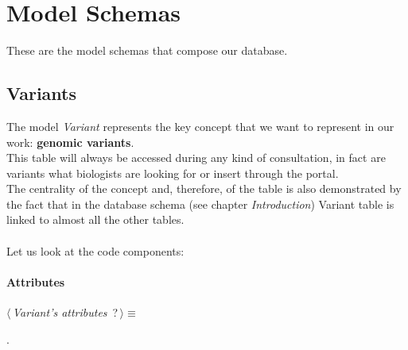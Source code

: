 
\section{Model Schemas}
These are the model schemas that compose our database.


\subsection{Variants}
The model \emph{Variant} represents the key concept that we want to represent in our work: \textbf{genomic variants}.
\\This table will always be accessed during any kind of consultation, in fact are variants what biologists are looking for or insert through the portal.
\\The centrality of the concept and, therefore, of the table is also demonstrated by the fact that in the database schema (see chapter \emph{Introduction}) Variant table is linked to almost all the other tables.
\\
\\Let us look at the code components:

\newpage

\paragraph{Attributes}      

	\begin{flushleft} \small
\begin{minipage}{\linewidth}\label{scrap2}\raggedright\small
{} $\langle\,${\itshape {Variant's attributes}}\nobreak\ {\footnotesize {?}}$\,\rangle\equiv$
\vspace{-1ex}
\begin{list}{}{} \item

                
        {\NWsep}
\end{list}
\vspace{-1.5ex}
\footnotesize
\begin{list}{}{\setlength{\itemsep}{-\parsep}\setlength{\itemindent}{-\leftmargin}}
\item {\NWtxtMacroNoRef}.

\item{}
\end{list}
\end{minipage}\vspace{4ex}
\end{flushleft}

